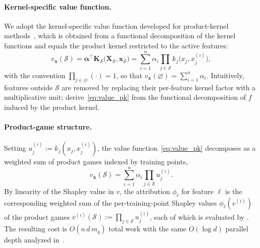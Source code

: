 \documentclass{article}
\newcommand{\cS}{\mathcal{S}}
\newcommand{\E}{\mathbb{E}}
\newcommand{\X}{\mathbf{X}}
\newcommand{\x}{\mathbf{x}}
\newcommand{\alphab}{\boldsymbol{\alpha}}
\newcommand{\K}{\mathbf{K}}
\begin{document}
\paragraph{Kernel-specific value function.}
We adopt the kernel-specific value function developed for product-kernel methods~\citep{pkex_shapley}, which is obtained from a functional decomposition of the kernel functions and equals the product kernel restricted to the active features:
\begin{equation}
\label{eq:value_pk}
v_{\x}(\cS) = \alphab^{\top}\K_{\cS}\bigl(\X_{\cS},\x_{\cS}\bigr)
=
\sum_{i=1}^n \alpha_i \prod_{j\in\cS} k_j\bigl(x_j, x^{(i)}_j\bigr),
\end{equation}
with the convention $\prod_{j\in\varnothing}(\cdot)=1$, so that $v_{\x}(\varnothing)=\sum_{i=1}^n \alpha_i$.
Intuitively, features outside $\cS$ are removed by replacing their per-feature kernel factor with a multiplicative unit; \citet{pkex_shapley} derive~\cref{eq:value_pk} from the functional decomposition of $f$ induced by the product kernel.

\paragraph{Product-game structure.}
Setting $u^{(i)}_j := k_j(x_j, x^{(i)}_j)$, the value function~\cref{eq:value_pk} decomposes as a weighted sum of product games indexed by training points,
\begin{equation}
\label{eq:value_pk_product_game}
v_{\x}(\cS) = \sum_{i=1}^n \alpha_i \prod_{j\in\cS} u^{(i)}_j.
\end{equation}
By linearity of the Shapley value in $v$, the attribution $\phi_\ell$ for feature $\ell$ is the corresponding weighted sum of the per-training-point Shapley values $\phi_\ell(v^{(i)})$ of the product games $v^{(i)}(\cS):=\prod_{j\in\cS}u^{(i)}_j$, each of which is evaluated by . The resulting cost is $O(n\,d\,m_q)$ total work with the same $O(\log d)$ parallel depth analyzed in~.


\end{document}
